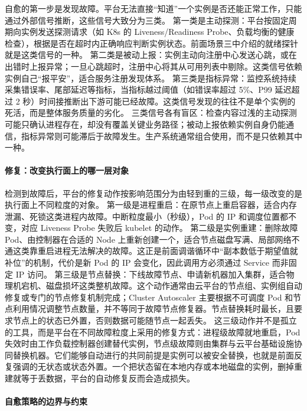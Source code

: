 自愈的第一步是发现故障。平台无法直接“知道”一个实例是否还能正常工作，只能通过外部信号推断，这些信号大致分为三类。
第一类是主动探测：平台按固定周期向实例发送探测请求（如 K8s 的 Liveness/Readiness Probe、负载均衡的健康检查），根据是否在超时内正确响应判断实例状态。前面场景三中介绍的就绪探针就是这类信号的一种。
第二类是被动上报：实例主动向注册中心发送心跳，或在出错时上报异常；一旦心跳超时，注册中心将其从可用列表中剔除。这类信号依赖实例自己“报平安”，适合服务注册发现体系。
第三类是指标异常：监控系统持续采集错误率、尾部延迟等指标，当指标越过阈值（如错误率超过 5\%、P99 延迟超过 2 秒）时间接推断出下游可能已经故障。这类信号发现的往往不是单个实例的死活，而是整体服务质量的劣化。
三类信号各有盲区：检查内容过浅的主动探测可能只确认进程存在，却没有覆盖关键业务路径；被动上报依赖实例自身仍能通信，指标异常则可能滞后于故障发生。生产系统通常组合使用，而不是只依赖其中一种。

\paragraph{修复：改变执行面上的哪一层对象}

检测到故障后，平台的修复动作按影响范围分为由轻到重的三级，每一级改变的是执行面上不同粒度的对象。
第一级是进程重启：在原节点上重启容器，适合内存泄漏、死锁这类进程内故障。中断粒度最小（秒级），Pod 的 IP 和调度位置都不变，对应 Liveness Probe 失败后 kubelet 的动作。
第二级是实例重建：删除故障 Pod、由控制器在合适的 Node 上重新创建一个，适合节点磁盘写满、局部网络不通这类靠重启进程无法解决的故障。这正是前面调谐循环中“副本数低于期望值就补位”的机制，代价是新 Pod 的 IP 会变化，因此调用方必须通过 Service 而非固定 IP 访问。
第三级是节点替换：下线故障节点、申请新机器加入集群，适合物理机宕机、磁盘损坏这类整机故障。这个动作通常由云平台的节点组、实例组自动修复或专门的节点修复机制完成；Cluster Autoscaler 主要根据不可调度 Pod 和节点利用情况调整节点数量，并不等同于故障节点修复器。节点替换耗时最长，且要求节点上的状态已外置，否则数据可能随节点一起丢失。
这三级动作并不是孤立的工具，而是平台在不同故障粒度上采用的修复方式：进程级故障就地重启，Pod 失效时由工作负载控制器创建替代实例，节点级故障则由集群与云平台基础设施协同替换机器。它们能够自动进行的共同前提是实例可以被安全替换，也就是前面反复强调的无状态或状态外置。一个把状态留在本地内存或本地磁盘的实例，删掉重建就等于丢数据，平台的自动修复反而会造成损失。

\paragraph{自愈策略的边界与约束}

